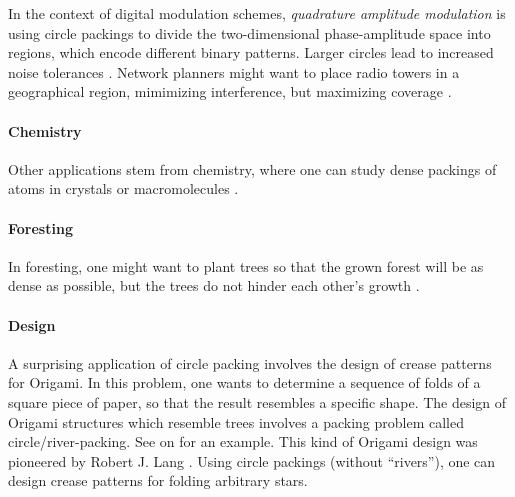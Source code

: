 \documentclass[a4paper,style=print,bibliography=totoc,nexus,lnum,extramargin]{tubsbook}
\begin{document}
In the context of digital modulation schemes, \emph{quadrature amplitude modulation} is using circle packings to divide the two-dimensional phase-amplitude space into regions, which encode different binary patterns. Larger circles lead to increased noise tolerances \parencite{PWMD1992packing}.
Network planners might want to place radio towers in a geographical region, mimimizing interference, but maximizing coverage \parencite{SMCSCG2007new}.

\paragraph{Chemistry}

Other applications stem from chemistry, where one can study dense packings of atoms in crystals or macromolecules \cite{WMP1994history}.

\paragraph{Foresting}

In foresting, one might want to plant trees so that the grown forest will be as dense as possible, but the trees do not hinder each other's growth \cite{SMCSCG2007new}.

\paragraph{Design}

A surprising application of circle packing involves the design of crease patterns for Origami. In this problem, one wants to determine a sequence of folds of a square piece of paper, so that the result resembles a specific shape. The design of Origami structures which resemble trees involves a packing problem called circle/river-packing. See  on  for an example. This kind of Origami design was pioneered by Robert J. Lang \cite{lang1996computational}. Using circle packings (without “rivers”), one can design crease patterns for folding arbitrary stars.



\end{document}
